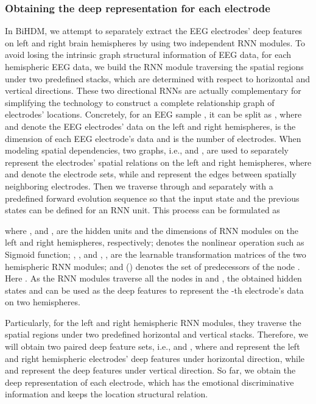 \documentclass[journal]{IEEEtran}
\begin{document}
\subsubsection{Obtaining the deep representation for each electrode}

In BiHDM, we attempt to separately extract the EEG electrodes' deep features on left and right brain hemispheres by using two independent RNN modules. To avoid losing the intrinsic graph structural information of EEG data, for each hemispheric EEG data, we build the RNN module traversing the spatial regions under two predefined stacks, which are determined with respect to horizontal and vertical directions. These two directional RNNs are actually complementary for simplifying the technology to construct a complete relationship graph of electrodes' locations. Concretely, for an EEG sample , it can be split as , where  and  denote the EEG electrodes' data on the left and right hemispheres,  is the dimension of each EEG electrode's data and  is the number of electrodes. When modeling spatial dependencies, two graphs, i.e.,  and , are used to separately represent the electrodes' spatial relations on the left and right hemispheres, where  and  denote the electrode sets, while  and  represent the edges between spatially neighboring electrodes. Then we traverse through  and  separately with a predefined forward evolution sequence so that the input state and the previous states can be defined for an RNN unit. This process can be formulated as

\vspace{-0.25cm}
	
where ,  and ,  are the hidden units and the dimensions of RNN modules on the left and right hemispheres, respectively;  denotes the nonlinear operation such as Sigmoid function; , ,  and , ,  are the learnable transformation matrices of the two hemispheric RNN modules; and  () denotes the set of predecessors of the node . Here . As the RNN modules traverse all the nodes in  and , the obtained hidden states  and  can be used as the deep features to represent the -th electrode's data on two hemispheres.

Particularly, for the left and right hemispheric RNN modules, they traverse the spatial regions under two predefined horizontal and vertical stacks. Therefore, we will obtain two paired deep feature sets, i.e.,	 and , where  and  represent the left and right hemispheric electrodes' deep features under horizontal direction, while  and  represent the deep features under vertical direction. So far, we obtain the deep representation of each electrode, which has the emotional discriminative information and keeps the location structural relation.
\end{document}
